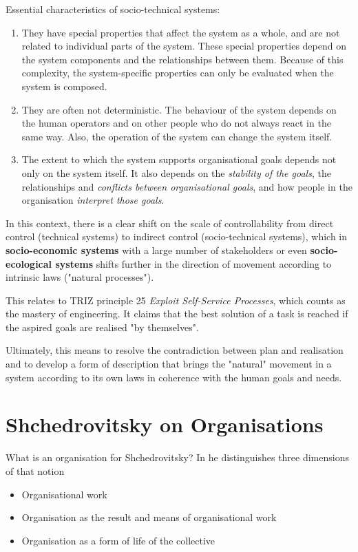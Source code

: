 \documentclass[11pt,a4paper]{article}
\begin{document}
Essential characteristics of socio-technical systems:
\begin{enumerate}
\item They have special properties that affect the system as a whole, and are
  not related to individual parts of the system. These special properties
  depend on the system components and the relationships between them. Because
  of this complexity, the system-specific properties can only be evaluated
  when the system is composed.
\item They are often not deterministic. The behaviour of the system depends on
  the human operators and on other people who do not always react in the same
  way. Also, the operation of the system can change the system itself.
\item The extent to which the system supports organisational goals depends not
  only on the system itself. It also depends on the \emph{stability of the
    goals}, the relationships and \emph{conflicts between organisational
    goals}, and how people in the organisation \emph{interpret those goals}.
\end{enumerate}

In this context, there is a clear shift on the scale of controllability from
direct control (technical systems) to indirect control (socio-technical
systems), which in \textbf{socio-economic systems} with a large number of
stakeholders or even \textbf{socio-ecological systems} shifts further in the
direction of movement according to intrinsic laws ("natural processes").

This relates to TRIZ principle 25 \emph{Exploit Self-Service Processes}, which
counts as the mastery of engineering.  It claims that the best solution of a
task is reached if the aspired goals are realised "by themselves".

Ultimately, this means to resolve the contradiction between plan and
realisation and to develop a form of description that brings the "natural"
movement in a system according to its own laws in coherence with the human
goals and needs.

\section{Shchedrovitsky on Organisations}

What is an organisation for Shchedrovitsky? In \cite[p. 30 ff]{MSM} he
distinguishes three dimensions of that notion
\begin{itemize}
\item Organisational work
\item Organisation as the result and means of organisational work
\item Organisation as a form of life of the collective
\end{itemize}
\end{document}
